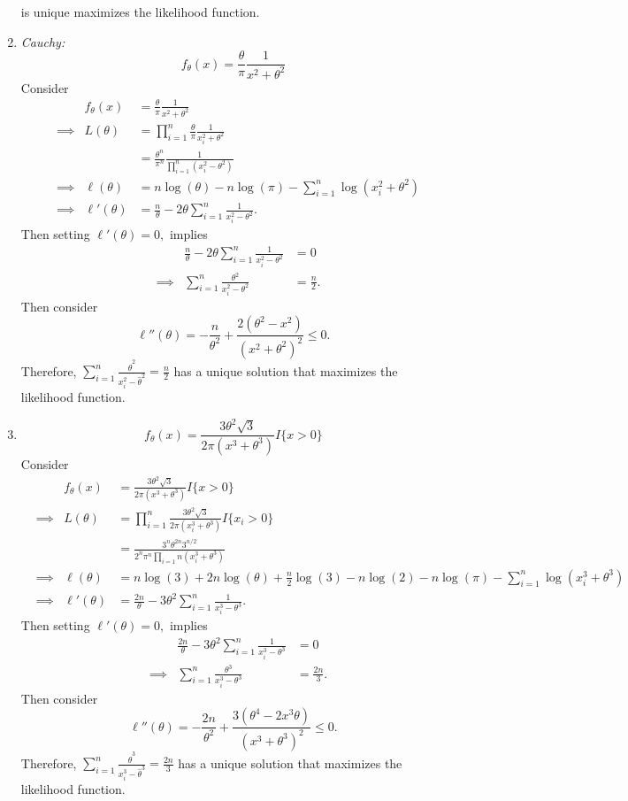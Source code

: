 \documentclass[12pt,]{article}
\begin{document}
\begin{enumerate}
  is unique maximizes the likelihood function.
\item
  \textit{Cauchy:}
  \[f_\theta(x)=\frac{\theta}{\pi}\frac{1}{x^2+\theta^2}\] Consider
  \begin{align*}
  &&f_\theta(x)&=\frac{\theta}{\pi}\frac{1}{x^2+\theta^2}\\
  &\implies& L(\theta)&=\prod_{i=1}^n \frac{\theta}{\pi}\frac{1}{x_i^2+\theta^2}\\
  &&& =\frac{\theta^n}{\pi^n}\frac{1}{\prod_{i=1}^n(x_i^2-\theta^2)}\\
  &\implies&\ell(\theta) &=n\log(\theta)-n\log(\pi)-\sum_{i=1}^n\log(x_i^2+\theta^2)\\
  &\implies&\ell'(\theta)&=\frac{n}{\theta}-2\theta \sum_{i=1}^n\frac{1}{x_i^2-\theta^2}.
  \end{align*} Then setting \(\ell'(\theta)=0,\) implies \begin{align*}
  &&\frac{n}{\theta}-2\theta \sum_{i=1}^n\frac{1}{x_i^2-\theta^2} & = 0\\
  &\implies& \sum_{i=1}^n\frac{\theta^2}{x_i^2-\theta^2} & = \frac{n}{2}.
  \end{align*} Then consider
  \[\ell''(\theta)=-\frac{n}{\theta^2}+\frac{2(\theta^2-x^2)}{(x^2+\theta^2)^2}\le 0.\]
  Therefore,
  \(\sum_{i=1}^n\frac{\hat\theta^2}{x_i^2-\hat\theta^2} = \frac{n}{2}\)
  has a unique solution that maximizes the likelihood function.
\item
  \[f_\theta(x)=\frac{3\theta^2\sqrt{3}}{2\pi(x^3+\theta^3)}I\{x>0\}\]
  Consider \begin{align*}
  &&f_\theta(x)&=\frac{3\theta^2\sqrt{3}}{2\pi(x^3+\theta^3)}I\{x>0\}\\
  &\implies& L(\theta)&=\prod_{i=1}^n \frac{3\theta^2\sqrt{3}}{2\pi(x_i^3+\theta^3)}I\{x_i>0\}\\
  &&& =\frac{3^n\theta^{2n}3^{n/2}}{2^n\pi^n\prod_{i=1}n(x_i^3+\theta^3)}\\
  &\implies&\ell(\theta) &=n\log(3)+2n\log(\theta)+\frac{n}{2}\log(3)-n\log(2)-n\log(\pi)-\sum_{i=1}^n\log(x_i^3+\theta^3)\\
  &\implies&\ell'(\theta)&=\frac{2n}{\theta}-3\theta^2 \sum_{i=1}^n\frac{1}{x_i^3-\theta^3}.
  \end{align*} Then setting \(\ell'(\theta)=0,\) implies \begin{align*}
  &&\frac{2n}{\theta}-3\theta^2 \sum_{i=1}^n\frac{1}{x_i^3-\theta^3} & = 0\\
  &\implies& \sum_{i=1}^n\frac{\theta^3}{x_i^3-\theta^3} & = \frac{2n}{3}.
  \end{align*} Then consider
  \[\ell''(\theta)=-\frac{2n}{\theta^2}+\frac{3(\theta^4-2x^3\theta)}{(x^3+\theta^3)^2}\le 0.\]
  Therefore,
  \(\sum_{i=1}^n\frac{\hat\theta^3}{x_i^3-\hat\theta^3} = \frac{2n}{3}\)
  has a unique solution that maximizes the likelihood function.
\end{enumerate}
\end{document}
